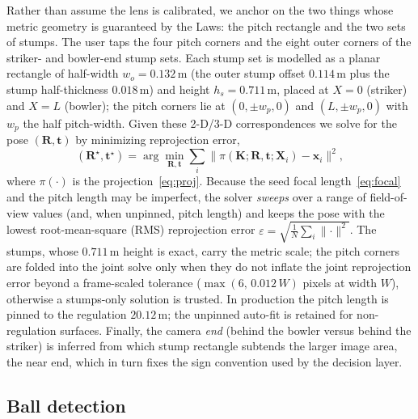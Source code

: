 \documentclass[journal]{IEEEtran}
\begin{document}
Rather than assume the lens is calibrated, we anchor on the two things whose
metric geometry is guaranteed by the Laws: the pitch rectangle and the two sets
of stumps. The user taps the four pitch corners and the eight outer corners of
the striker- and bowler-end stump sets. Each stump set is modelled as a planar
rectangle of half-width $w_{o}=0.132$\,m (the outer stump offset
$0.114$\,m plus the stump half-thickness $0.018$\,m) and height $h_s=0.711$\,m,
placed at $X=0$ (striker) and $X=L$ (bowler); the pitch corners lie at
$(0,\pm w_p,0)$ and $(L,\pm w_p,0)$ with $w_p$ the half pitch-width. Given these
2-D/3-D correspondences we solve for the pose $(\mathbf{R},\mathbf{t})$ by
minimizing reprojection error,
\begin{equation}
(\mathbf{R}^\star,\mathbf{t}^\star)=\arg\min_{\mathbf{R},\mathbf{t}}
\sum_{i}\bigl\lVert \pi(\mathbf{K};\mathbf{R},\mathbf{t};\mathbf{X}_i)-\mathbf{x}_i\bigr\rVert^2,
\label{eq:pnp}
\end{equation}
where $\pi(\cdot)$ is the projection~\eqref{eq:proj}. Because the seed focal
length~\eqref{eq:focal} and the pitch length may be imperfect, the solver
\emph{sweeps} over a range of field-of-view values (and, when unpinned, pitch
length) and keeps the pose with the lowest root-mean-square (RMS) reprojection
error $\varepsilon=\sqrt{\frac1N\sum_i\lVert\cdot\rVert^2}$. The stumps, whose
$0.711$\,m height is exact, carry the metric scale; the pitch corners are folded
into the joint solve only when they do not inflate the joint reprojection error
beyond a frame-scaled tolerance ($\max(6,\,0.012\,W)$ pixels at width $W$),
otherwise a stumps-only solution is trusted. In production the pitch length is
pinned to the regulation $20.12$\,m; the unpinned auto-fit is retained for
non-regulation surfaces. Finally, the camera \emph{end} (behind the bowler
versus behind the striker) is inferred from which stump rectangle subtends the
larger image area, the near end, which in turn fixes the sign convention used
by the decision layer.

\subsection{Ball detection}
\label{sec:detect}
\end{document}

